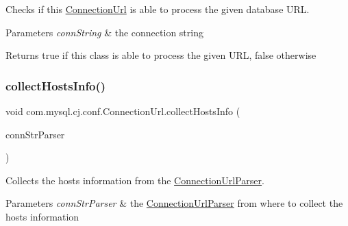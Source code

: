 Checks if this \mbox{\hyperlink{classcom_1_1mysql_1_1cj_1_1conf_1_1_connection_url}{Connection\+Url}} is able to process the given database U\+RL.


\begin{DoxyParams}{Parameters}
{\em conn\+String} & the connection string \\
\hline
\end{DoxyParams}
\begin{DoxyReturn}{Returns}
true if this class is able to process the given U\+RL, false otherwise 
\end{DoxyReturn}
\mbox{\label{classcom_1_1mysql_1_1cj_1_1conf_1_1_connection_url_acab0ee9a544e643d843f1d1e82052a0b}} 
\subsubsection{\texorpdfstring{collect\+Hosts\+Info()}{collectHostsInfo()}}
{\footnotesize\ttfamily void com.\+mysql.\+cj.\+conf.\+Connection\+Url.\+collect\+Hosts\+Info (\begin{DoxyParamCaption}\item[{\mbox{\hyperlink{classcom_1_1mysql_1_1cj_1_1conf_1_1_connection_url_parser}{Connection\+Url\+Parser}}}]{conn\+Str\+Parser }\end{DoxyParamCaption})\hspace{0.3cm}{\ttfamily [protected]}}

Collects the hosts information from the \mbox{\hyperlink{classcom_1_1mysql_1_1cj_1_1conf_1_1_connection_url_parser}{Connection\+Url\+Parser}}.


\begin{DoxyParams}{Parameters}
{\em conn\+Str\+Parser} & the \mbox{\hyperlink{classcom_1_1mysql_1_1cj_1_1conf_1_1_connection_url_parser}{Connection\+Url\+Parser}} from where to collect the hosts information \\
\hline
\end{DoxyParams}
\mbox{\label{classcom_1_1mysql_1_1cj_1_1conf_1_1_connection_url_a95514a35cecb2df9fd97562e37405447}} 
